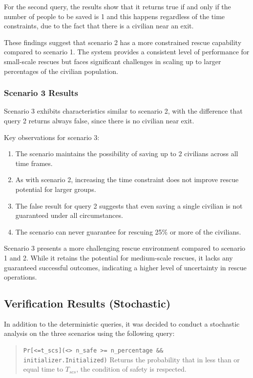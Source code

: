 For the second query, the results show that it returns true if and only if the number of people to be saved is 1 and this happens regardless of the time constraints, due to the fact that there is a civilian near an exit.

These findings suggest that scenario 2 has a more constrained rescue capability compared to scenario 1. The system provides a consistent level of performance for small-scale rescues but faces significant challenges in scaling up to larger percentages of the civilian population.


\subsubsection{Scenario 3 Results}

Scenario 3 exhibits characteristics similar to scenario 2, with the difference that query 2 returns always false, since there is no civilian near exit.

Key observations for scenario 3:
\begin{enumerate}
	\item The scenario maintains the possibility of saving up to 2 civilians across all time frames.
	\item As with scenario 2, increasing the time constraint does not improve rescue potential for larger groups.
	\item The false result for query 2 suggests that even saving a single civilian is not guaranteed under all circumstances.
	\item The scenario can never guarantee for rescuing 25\% or more of the civilians.
\end{enumerate}

Scenario 3 presents a more challenging rescue environment compared to scenario 1 and 2. While it retains the potential for medium-scale rescues, it lacks any guaranteed successful outcomes, indicating a higher level of uncertainty in rescue operations.

\subsection{Verification Results (Stochastic)}
In addition to the deterministic queries, it was decided to conduct a stochastic analysis on the three scenarios using the following query:

\begin{quote}
	\texttt{Pr[<=t\_scs](<> n\_safe >= n\_percentage \&\& initializer.Initialized)}\newline
            Returns the probability that in less than or equal time to $T_{scs}$, the condition of safety is respected.
\end{quote}

